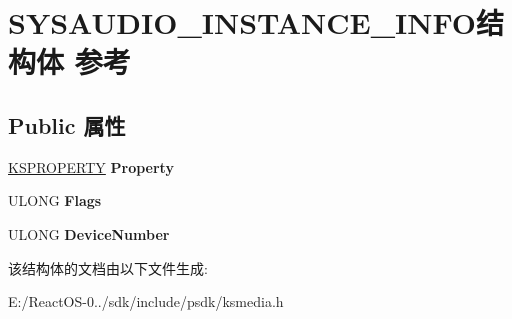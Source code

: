 \hypertarget{struct_s_y_s_a_u_d_i_o___i_n_s_t_a_n_c_e___i_n_f_o}{}\section{S\+Y\+S\+A\+U\+D\+I\+O\+\_\+\+I\+N\+S\+T\+A\+N\+C\+E\+\_\+\+I\+N\+F\+O结构体 参考}
\label{struct_s_y_s_a_u_d_i_o___i_n_s_t_a_n_c_e___i_n_f_o}
\subsection*{Public 属性}
\begin{DoxyCompactItemize}
\item 
\mbox{\label{struct_s_y_s_a_u_d_i_o___i_n_s_t_a_n_c_e___i_n_f_o_afa4397c0635273446387bdc123236e4b}} 
\hyperlink{struct_k_s_i_d_e_n_t_i_f_i_e_r}{K\+S\+P\+R\+O\+P\+E\+R\+TY} {\bfseries Property}
\item 
\mbox{\label{struct_s_y_s_a_u_d_i_o___i_n_s_t_a_n_c_e___i_n_f_o_a9d8a010d0df392275b8c28b09360edee}} 
U\+L\+O\+NG {\bfseries Flags}
\item 
\mbox{\label{struct_s_y_s_a_u_d_i_o___i_n_s_t_a_n_c_e___i_n_f_o_aa03ad35de3de50a14ad614011dc212cb}} 
U\+L\+O\+NG {\bfseries Device\+Number}
\end{DoxyCompactItemize}


该结构体的文档由以下文件生成\+:\begin{DoxyCompactItemize}
\item 
E\+:/\+React\+O\+S-\/0../sdk/include/psdk/ksmedia.\+h\end{DoxyCompactItemize}
